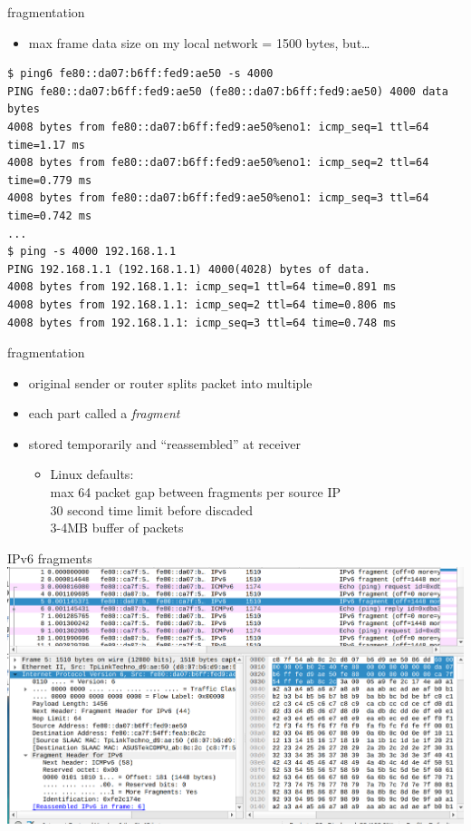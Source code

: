 \begin{frame}[fragile]{fragmentation}
\begin{itemize}
\item max frame data size on my local network = 1500 bytes, but\ldots
\end{itemize}
\begin{Verbatim}[fontsize=\small]
$ ping6 fe80::da07:b6ff:fed9:ae50 -s 4000
PING fe80::da07:b6ff:fed9:ae50 (fe80::da07:b6ff:fed9:ae50) 4000 data bytes
4008 bytes from fe80::da07:b6ff:fed9:ae50%eno1: icmp_seq=1 ttl=64 time=1.17 ms
4008 bytes from fe80::da07:b6ff:fed9:ae50%eno1: icmp_seq=2 ttl=64 time=0.779 ms
4008 bytes from fe80::da07:b6ff:fed9:ae50%eno1: icmp_seq=3 ttl=64 time=0.742 ms
...
$ ping -s 4000 192.168.1.1                 
PING 192.168.1.1 (192.168.1.1) 4000(4028) bytes of data.     
4008 bytes from 192.168.1.1: icmp_seq=1 ttl=64 time=0.891 ms 
4008 bytes from 192.168.1.1: icmp_seq=2 ttl=64 time=0.806 ms 
4008 bytes from 192.168.1.1: icmp_seq=3 ttl=64 time=0.748 ms 
\end{Verbatim}
\end{frame}

\begin{frame}{fragmentation}
    \begin{itemize}
    \item original sender or router splits packet into multiple
    \item each part called a \textit{fragment}
    \vspace{.5cm}
    \item stored temporarily and ``reassembled'' at receiver
        \begin{itemize}
        \item Linux defaults: \\
        max 64 packet gap between fragments per source IP \\
        30 second time limit before discaded \\
        3-4MB buffer of packets 
        \end{itemize}
    \end{itemize}
\end{frame}

\begin{frame}{IPv6 fragments}
\includegraphics[width=\textwidth]{../routing/ipv6-fragment-ex}
\end{frame}

